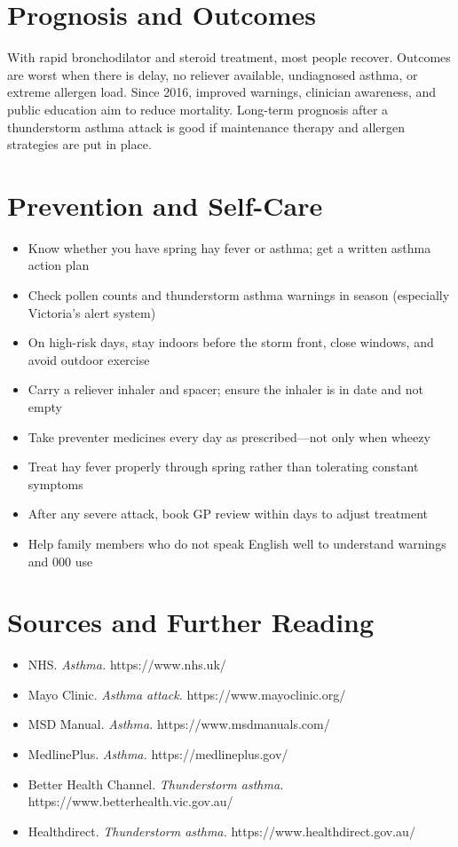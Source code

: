 \section*{Prognosis and Outcomes}
With rapid bronchodilator and steroid treatment, most people recover. Outcomes are worst when there is delay, no reliever available, undiagnosed asthma, or extreme allergen load. Since 2016, improved warnings, clinician awareness, and public education aim to reduce mortality. Long-term prognosis after a thunderstorm asthma attack is good if maintenance therapy and allergen strategies are put in place.

\section*{Prevention and Self-Care}
\begin{itemize}
    \item Know whether you have spring hay fever or asthma; get a written asthma action plan
    \item Check pollen counts and thunderstorm asthma warnings in season (especially Victoria's alert system)
    \item On high-risk days, stay indoors before the storm front, close windows, and avoid outdoor exercise
    \item Carry a reliever inhaler and spacer; ensure the inhaler is in date and not empty
    \item Take preventer medicines every day as prescribed---not only when wheezy
    \item Treat hay fever properly through spring rather than tolerating constant symptoms
    \item After any severe attack, book GP review within days to adjust treatment
    \item Help family members who do not speak English well to understand warnings and 000 use
\end{itemize}

\section*{Sources and Further Reading}
\begin{itemize}
    \item NHS. \textit{Asthma.} https://www.nhs.uk/
    \item Mayo Clinic. \textit{Asthma attack.} https://www.mayoclinic.org/
    \item MSD Manual. \textit{Asthma.} https://www.msdmanuals.com/
    \item MedlinePlus. \textit{Asthma.} https://medlineplus.gov/
    \item Better Health Channel. \textit{Thunderstorm asthma.} https://www.betterhealth.vic.gov.au/
    \item Healthdirect. \textit{Thunderstorm asthma.} https://www.healthdirect.gov.au/
\end{itemize}
